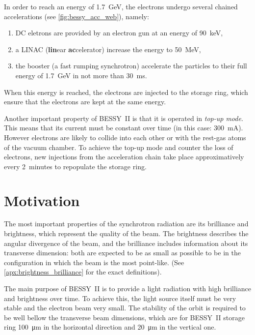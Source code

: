 In order to reach an energy of \SI{1.7}{\giga\electronvolt}, the electrons undergo several chained accelerations (see \cref{fig:bessy_acc_web}), namely:
\begin{enumerate}
    \item DC eletrons are provided by an electron gun at an energy of \SI{90}{\kilo\electronvolt},
    \item a LINAC (\textbf{lin}ear \textbf{ac}celerator) increase the energy to \SI{50}{\mega\electronvolt},
    \item the booster (a fast rumping synchrotron) accelerate the particles to their full energy of \SI{1.7}{\giga\electronvolt} in not more than \SI{30}{\milli\second}.
\end{enumerate}

When this energy is reached, the electrons are injected to the storage ring, which ensure that the electrons are kept at the same energy.

Another important property of BESSY~II is that it is operated in \textit{top-up mode}. This means that its current must be constant over time (in this case: \SI{300}{\milli\ampere}). However electrons are likely to collide into each other or with the rest-gas atoms of the vacuum chamber. To achieve the top-up mode and counter the loss of electrons, new injections from the acceleration chain take place approximatively every 2~minutes to repopulate the storage ring.

\section{Motivation}
The most important properties of the synchrotron radiation are its brilliance and brightness, which represent the quality of the beam. The brightness describes the angular divergence of the beam, and the brilliance includes information about its transverse dimension: both are expected to be as small as possible to be in the configuration in which the beam is the most point-like. (See \cref{apx:brightness_brilliance} for the exact definitions).

The main purpose of BESSY~II is to provide a light radiation with high brilliance and brightness over time. To achieve this, the light source itself must be very stable and the electron beam very small. The stability of the orbit is required to be well bellow the transverse beam dimensions, which are for BESSY~II storage ring \SI{100}{\micro\meter} in the horizontal direction and \SI{20}{\micro\meter} in the vertical one.

